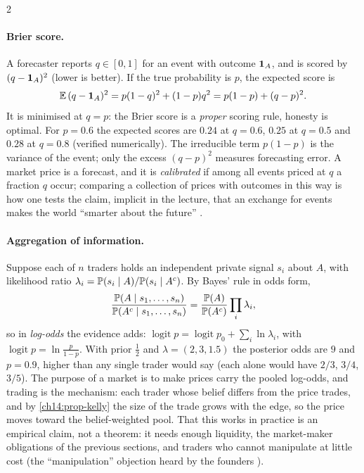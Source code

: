 \begin{paracol}{2}
\paragraph{Brier score.} A forecaster reports $q\in[0,1]$ for an event with outcome $\mathbf{1}_A$, and is scored by
$(q-\mathbf{1}_A)^2$ (lower is better). If the true probability is $p$, the expected score is
\[
  \mathbb{E}\,(q-\mathbf{1}_A)^2 = p(1-q)^2+(1-p)q^2 = p(1-p)+(q-p)^2 .
\]
It is minimised at $q=p$: the Brier score is a \emph{proper} scoring rule, honesty is optimal. For $p=0.6$ the expected scores are
$0.24$ at $q=0.6$, $0.25$ at $q=0.5$ and $0.28$ at $q=0.8$ (verified numerically). The irreducible term $p(1-p)$ is the variance of the event;
only the excess $(q-p)^2$ measures forecasting error. A market price is a forecast, and it is \emph{calibrated} if among all events priced at $q$ a fraction $q$ occur;
comparing a collection of prices with outcomes in this way is how one tests the claim, implicit in the lecture, that an exchange for events makes the
world ``smarter about the future'' .

\paragraph{Aggregation of information.} Suppose each of $n$ traders holds an independent private signal $s_i$ about $A$, with likelihood
ratio $\lambda_i=\mathbb{P}(s_i\mid A)/\mathbb{P}(s_i\mid A^c)$. By Bayes' rule in odds form,
\[
  \frac{\mathbb{P}(A\mid s_1,\dots,s_n)}{\mathbb{P}(A^c\mid s_1,\dots,s_n)}=\frac{\mathbb{P}(A)}{\mathbb{P}(A^c)}\prod_i\lambda_i,
\]
so in \emph{log-odds} the evidence adds: $\operatorname{logit}p=\operatorname{logit}p_0+\sum_i\ln\lambda_i$, with $\operatorname{logit}p=\ln\frac p{1-p}$.
With prior $\tfrac12$ and $\lambda=(2,3,1.5)$ the posterior odds are $9$ and $p=0.9$, higher than any single trader would say
(each alone would have $2/3$, $3/4$, $3/5$). The purpose of a market is to make prices carry the pooled log-odds, and
trading is the mechanism: each trader whose belief differs from the price trades, and by \cref{ch14:prop-kelly}
the size of the trade grows with the edge, so the price moves toward the belief-weighted pool. That this works
in practice is an empirical claim, not a theorem: it needs enough liquidity, the market-maker obligations of the previous sections, and traders who cannot manipulate at little cost
(the ``manipulation'' objection heard by the founders ).


\end{paracol}
